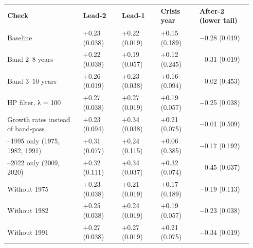 \documentclass[11pt,a4paper]{article}
\newcounter{none}                    %
\begin{document}
{\def\LTcaptype{none} %
\begin{longtable}[]{@{}
  >{\raggedright\arraybackslash}p{}
  >{\raggedright\arraybackslash}p{}
  >{\raggedright\arraybackslash}p{}
  >{\raggedright\arraybackslash}p{}
  >{\raggedright\arraybackslash}p{}@{}}
\toprule\noalign{}
\begin{minipage}[b]{\linewidth}\raggedright
Check
\end{minipage} & \begin{minipage}[b]{\linewidth}\raggedright
Lead-2
\end{minipage} & \begin{minipage}[b]{\linewidth}\raggedright
Lead-1
\end{minipage} & \begin{minipage}[b]{\linewidth}\raggedright
Crisis year
\end{minipage} & \begin{minipage}[b]{\linewidth}\raggedright
After-2 (lower tail)
\end{minipage} \\
\midrule\noalign{}
\endhead
\bottomrule\noalign{}
\endlastfoot
Baseline & +0.23 (0.038) & +0.22 (0.019) & +0.15 (0.189) & −0.28 (0.019) \\
Band 2–8 years & +0.22 (0.038) & +0.19 (0.057) & +0.12 (0.245) & −0.31 (0.019) \\
Band 3–10 years & +0.26 (0.019) & +0.23 (0.038) & +0.16 (0.094) & −0.02 (0.453) \\
HP filter, λ = 100 & +0.27 (0.038) & +0.27 (0.019) & +0.19 (0.057) & −0.25 (0.038) \\
Growth rates instead of band-pass & +0.23 (0.094) & +0.34 (0.038) & +0.21 (0.075) & −0.01 (0.509) \\
1970–1995 only (1975, 1982, 1991) & +0.31 (0.077) & +0.24 (0.115) & +0.06 (0.385) & −0.17 (0.192) \\
1996–2022 only (2009, 2020) & +0.32 (0.111) & +0.34 (0.037) & +0.32 (0.074) & −0.45 (0.037) \\
Without 1975 & +0.23 (0.038) & +0.21 (0.019) & +0.17 (0.189) & −0.19 (0.113) \\
Without 1982 & +0.25 (0.038) & +0.24 (0.019) & +0.19 (0.057) & −0.23 (0.038) \\
Without 1991 & +0.27 (0.038) & +0.27 (0.019) & +0.21 (0.075) & −0.34 (0.019) \\

\end{longtable}}
\end{document}
